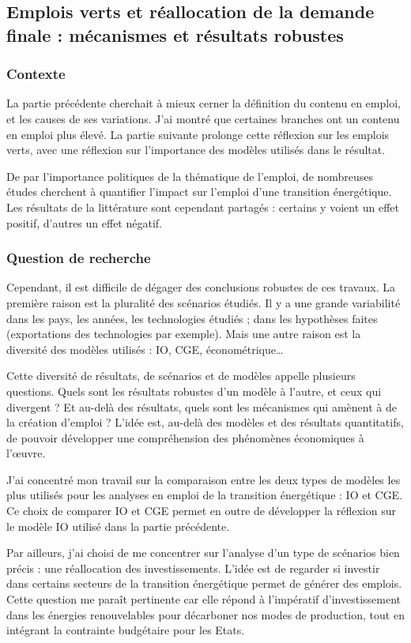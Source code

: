 \subsection{Emplois verts et réallocation de la demande finale : mécanismes et résultats robustes}
\subsubsection{Contexte}
La partie précédente cherchait à mieux cerner la définition du contenu en emploi, et les causes de ses variations. J’ai montré que certaines branches ont un contenu en emploi plus élevé. 
La partie suivante prolonge cette réflexion sur les emplois verts, avec une réflexion sur l’importance des modèles utilisés dans le résultat. 

De par l'importance politiques de la thématique de l'emploi, de nombreuses études cherchent à quantifier l'impact sur l'emploi d'une transition énergétique. Les résultats de la littérature sont cependant partagés : certains y voient un effet positif, d’autres un effet négatif.

\subsubsection{Question de recherche}
Cependant, il est difficile de dégager des conclusions robustes de ces travaux. La première raison est la pluralité des scénarios étudiés. Il y a une grande variabilité dans les pays, les années, les technologies étudiés ; dans les hypothèses faites (exportations des technologies par exemple).
Mais une autre raison est la diversité des modèles utilisés : IO, CGE, économétrique…

Cette diversité de résultats, de scénarios et de modèles appelle plusieurs questions. Quels sont les résultats robustes d’un modèle à l’autre, et ceux qui divergent ? Et au-delà des résultats, quels sont les mécanismes qui amènent à de la création d’emploi ? L’idée est, au-delà des modèles et des résultats quantitatifs, de pouvoir développer une compréhension des phénomènes économiques à l’œuvre. 

J’ai concentré mon travail sur la comparaison entre les deux types de modèles les plus utilisés pour les analyses en emploi de la transition énergétique : IO et CGE. Ce choix de comparer IO et CGE permet en outre de développer la réflexion sur le modèle IO utilisé dans la partie précédente.

Par ailleurs, j’ai choisi de me concentrer sur l’analyse d’un type de scénarios bien précis : une réallocation des investissements. L’idée est de regarder si investir dans certains secteurs de la transition énergétique permet de générer des emplois. Cette question me paraît pertinente car elle répond à l’impératif d’investissement dans les énergies renouvelables pour décarboner nos modes de production, tout en intégrant la contrainte budgétaire pour les Etats.

